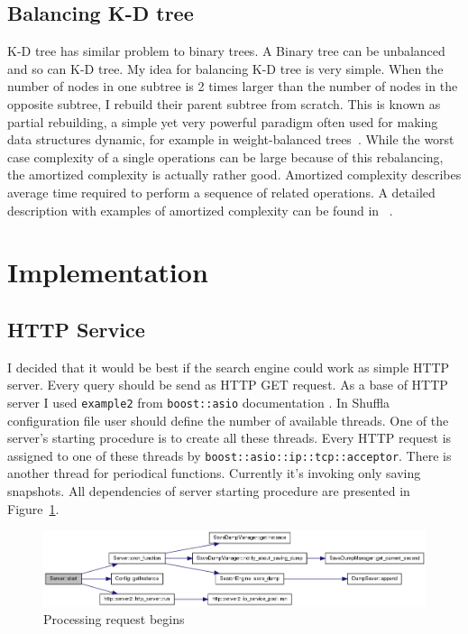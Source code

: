 \documentclass[10pt,a4paper]{article}
\begin{document}
\subsection{Balancing K-D tree}
K-D tree has similar problem to binary trees. A Binary tree can be unbalanced and so can K-D tree. My idea for balancing K-D tree is very simple. When the number of nodes in one subtree is 2 times larger than the number of nodes in the opposite subtree, I rebuild their parent subtree from scratch.
This is known as partial rebuilding, a simple yet very powerful paradigm often used for making data structures dynamic, for example in weight-balanced trees~\cite{ALPHATREES}. While the worst case complexity of a single operations can be large because of this rebalancing, the amortized complexity is actually rather good. Amortized complexity describes average time required to perform a sequence of related operations. A detailed description with examples of amortized complexity can be found in ~\cite{AMOR}.

\section{Implementation}

\subsection{HTTP Service}

I decided that it would be best if the search engine could work as simple HTTP server. Every query should be send as HTTP GET request. As a base of HTTP server I used \verb|example2| from \verb|boost::asio| documentation \cite{ASIOHTTP}. In Shuffla configuration file user should define the number of available threads. One of the server's starting procedure is to create all these threads. Every HTTP request is assigned to one of these threads by \verb|boost::asio::ip::tcp::acceptor|. There is another thread for periodical functions. Currently it's invoking only saving snapshots. All dependencies of server starting procedure are presented in Figure~\ref{fig:httpservice}.

\begin{figure}[h!]
\centering
  \includegraphics[width=16cm]{start}
  \caption{Processing request begins}
  \label{fig:httpservice}
\end{figure}
\end{document}

